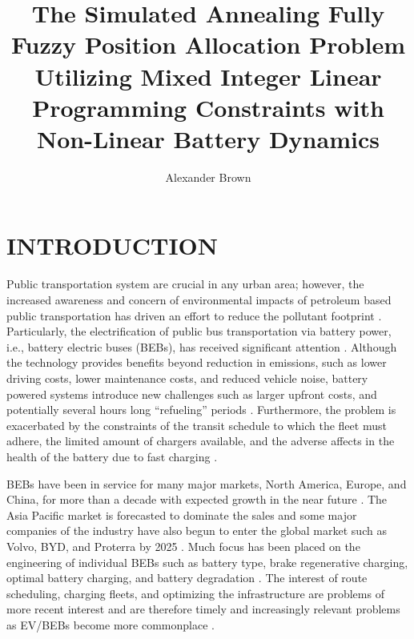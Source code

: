 \documentclass[ee,msthesis]{usuthesis}
\author{Alexander Brown}
\date{}
\title{The Simulated Annealing Fully Fuzzy Position Allocation Problem Utilizing Mixed Integer Linear Programming Constraints with Non-Linear Battery Dynamics}
\begin{document}
\maketitle
\let\ref\autoref                            %

\tableofcontents
\listoftables
\listoffigures

\let\ref\autoref                            %

\body  %

\chapter{INTRODUCTION}
\label{sec:introduction}
Public transportation system are crucial in any urban area; however, the increased awareness and concern of
environmental impacts of petroleum based public transportation has driven an effort to reduce the pollutant footprint
\cite{de-2014-simul-elect,xylia-2018-role-charg,guida-2017-zeeus-repor-europ,li-2016-batter-elect}. Particularly,
the electrification of public bus transportation via battery power, i.e., battery electric buses (BEBs), has received
significant attention \cite{li-2016-batter-elect}. Although the technology provides benefits beyond reduction in
emissions, such as lower driving costs, lower maintenance costs, and reduced vehicle noise, battery powered systems
introduce new challenges such as larger upfront costs, and potentially several hours long ``refueling'' periods
\cite{xylia-2018-role-charg,li-2016-batter-elect}. Furthermore, the problem is exacerbated by the constraints of the
transit schedule to which the fleet must adhere, the limited amount of chargers available, and the adverse affects in
the health of the battery due to fast charging \cite{lutsey-2019-updat-elect}.

BEBs have been in service for many major markets, North America, Europe, and China, for more than a decade with expected
growth in the near future \cite{deng-2021-survey-elect}. The Asia Pacific market is forecasted to dominate the sales
and some major companies of the industry have also begun to enter the global market such as Volvo, BYD, and Proterra by
2025 \cite{deng-2021-survey-elect}. Much focus has been placed on the engineering of individual BEBs such as battery
type, brake regenerative charging, optimal battery charging, and battery degradation \cite{chen-2008-desig-grey,abdollahi-2016-optim-batter,kühne-2010-elect,deng-2021-survey-elect}. The interest of route scheduling, charging
fleets, and optimizing the infrastructure are problems of more recent interest and are therefore timely and increasingly
relevant problems as EV/BEBs become more commonplace \cite{hoke-2014-accoun-lithium,sebastiani-2016-evaluat-elect,wei-2018-optim-spatio}.
\end{document}
